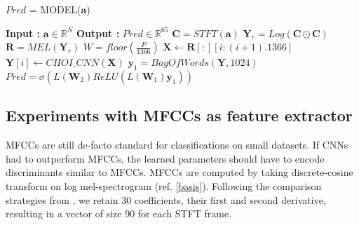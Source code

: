 \begin{algorithm}
  \caption{$Pred$ = MODEL($\textbf{a}$) }\label{alg:cnnbow}
  \begin{algorithmic}[1]
    \Statex \textbf{Input :} $\textbf{a} \in \mathbb{R}^{N}$
    \Statex \textbf{Output :} $Pred \in \mathbb{R}^{65}$ 
    \State $\textbf{C} = STFT(\textbf{a})$ 
    \State $\textbf{Y}_{r} = Log(\textbf{C} \odot \textbf{C})$ 
    \State $\textbf{R} = MEL(\textbf{Y}_{r})$ 
    \State $W = floor(\frac{P}{1366})$
      \State $\textbf{X} \leftarrow \textbf{R}[:][i:(i+1).1366]$ 
      \State $\textbf{Y}[i] \leftarrow CHOI\_CNN(\textbf{X})$  
    \EndFor
    \State $\textbf{y}_{1} = BagOfWords(\textbf{Y},1024)$ 
     \State $Pred = \sigma(L(\textbf{W}_{2})ReLU(L(\textbf{W}_{1})\textbf{y}_{1}))$ 
  \end{algorithmic}
\end{algorithm}
    
\subsection{Experiments with MFCCs as feature extractor}    
\label{mfcc}  
MFCCs are still de-facto standard for classifications on small datasets. If CNNs had to outperform MFCCs, the learned parameters should have to encode discriminants similar to MFCCs. MFCCs are computed by taking discrete-cosine transform on log mel-spectrogram (ref. \ref{basis}). Following the comparison strategies from \cite{choi_cnn}, we retain 30 coefficients, their first and second derivative, resulting in a vector of size 90 for each STFT frame.
\bigskip

